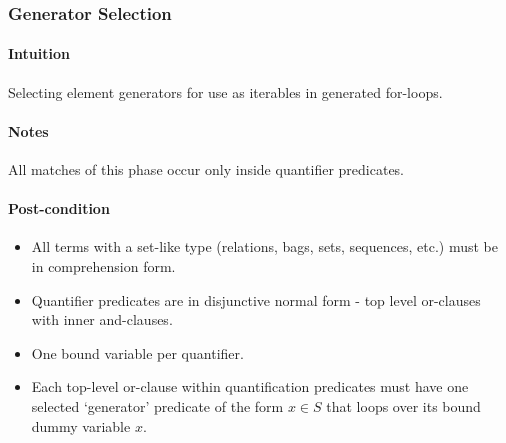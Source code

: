 \documentclass{article}
\begin{document}
\subsubsection{Generator Selection}

\paragraph{Intuition} Selecting element generators for use as iterables in generated for-loops.

\paragraph{Notes} All matches of this phase occur only inside quantifier predicates.

\paragraph{Post-condition}
\begin{itemize}
  \item All terms with a set-like type (relations, bags, sets, sequences, etc.) must be in comprehension form.
  \item Quantifier predicates are in disjunctive normal form - top level or-clauses with inner and-clauses.
  \item One bound variable per quantifier.
  \item Each top-level or-clause within quantification predicates must have one selected `generator' predicate of the form $x \in S$ that loops over its bound dummy variable $x$.
\end{itemize}
\end{document}
